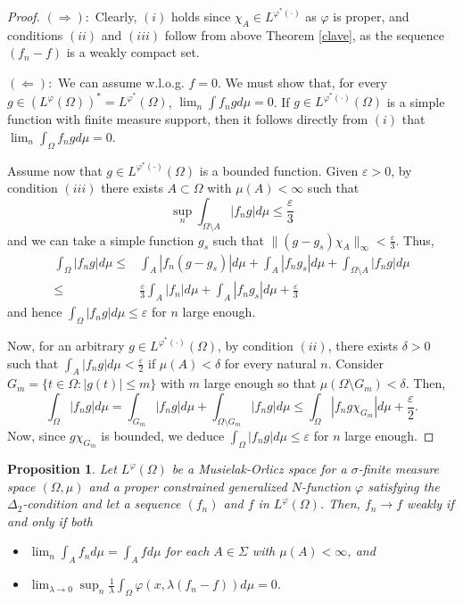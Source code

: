 \documentclass[11pt,a4paper]{amsart}
\newtheorem{proposicion}[definicion]{Proposition}
\newcommand{\lphi}{{L^{\varphi}(\Omega)}}
\begin{document}
\begin{proof}  $(\Rightarrow):$ Clearly, $(i)$ holds since $\chi_{A} \in L^{\varphi^{*}(\cdot)}$ as $\varphi$ is proper, and conditions $(ii)$ and $(iii)$ follow from above Theorem \ref{clave}, as the sequence $(f_n-f)$ is a weakly compact set.

$(\Leftarrow):$
    We can assume w.l.o.g.  $f=0$. We must show that, for every $g\in (L^{\varphi}(\Omega))^*= L^{\varphi^*}(\Omega)$, $\lim_n \int f_ng d\mu=0$. If  $g\in L^{\varphi^{*}(\cdot)}(\Omega)$ is a simple function with finite measure support, then it follows directly from $(i)$ that $\lim_{n} \int_{\Omega} f_{n}g  d\mu = 0$.
    
    Assume now that $g\in L^{\varphi^*(\cdot)}(\Omega)$ is a bounded function.
    Given $\varepsilon > 0$, by condition $(iii)$ there exists $A\subset \Omega$ with $\mu(A)<\infty$ such that
    $$
    \sup_{n} \int_{\Omega\setminus A} \vert f_{n} g\vert d\mu \leq\frac{\varepsilon}{3}
    $$
    and we can take a simple function $g_{s}$ such that $\lVert(g-g_{s})\chi_{A}\rVert_{\infty} < \frac{\varepsilon}{3}$. Thus,
    \begin{align*}
    \int_{\Omega} |f_{n} g| d\mu
    \leq{}  &   \int_{A} |f_{n} (g-g_{s})| d\mu + \int_{A} |f_{n}g_{s}| d\mu + \int_{\Omega\setminus A} \vert f_n g\vert d\mu \\
    \leq{}  &   \frac{\varepsilon}{3} \int_{A} |f_{n}| d\mu + \int_{A} |f_{n}g_{s}| d\mu + \frac{\varepsilon}{3}
    \end{align*}
    and hence $\int_{\Omega} |f_{n} g| d\mu  \leq \varepsilon$ for $n$ large enough.

    Now, for an arbitrary $g\in L^{\varphi^{*}(\cdot)}(\Omega)$, by condition $(ii)$, there exists $\delta > 0$ such that $\int_{A} |f_{n} g| d\mu < \frac{\varepsilon}{2}$ if $\mu(A) < \delta$ for every natural $n$. Consider $G_{m}= \{t \in \Omega: |g(t)|\leq m\}$ with $m$ large enough so that $\mu(\Omega\setminus G_{m}) < \delta $. Then,
    $$
    \int_{\Omega} |f_{n} g| d\mu
    =\int_{G_{m}} |f_{n} g| d\mu + \int_{\Omega\setminus G_{m}} |f_{n} g | d\mu
    \leq  \int_{\Omega} |f_{n} g \chi_{G_{m}}| d\mu + \frac{\varepsilon}{2}.
    $$
    Now, since $g\chi_{G_m}$ is bounded, we deduce $\int_{\Omega} |f_{n} g| d\mu \leq \varepsilon$ for $n$ large enough.
\end{proof}

\begin{proposicion}\label{sucesiones2}
Let $\lphi$ be a Musielak-Orlicz space for a $\sigma$-finite measure space $(\Omega,\mu)$ and a proper constrained generalized $N$-function $\varphi$ satisfying the $\Delta_2$-condition and let a sequence $(f_{n})$ and $f$ in $\lphi$. Then, $f_n\rightarrow f$ weakly if and only if both
\begin{itemize}
    \item [$(i)$] $\lim_{n} \int_{A} f_{n} d\mu  = \int_{A} f  d\mu$ for each $A\in \Sigma$ with $\mu(A)<\infty$, and
    \item [$(ii)$] $\lim_{\lambda\rightarrow 0}\sup_{n} \frac{1}{\lambda}\int_{\Omega} \varphi(x, \lambda ( f_{n}-f) ) d\mu = 0$.
\end{itemize}
\end{proposicion}
\end{document}

